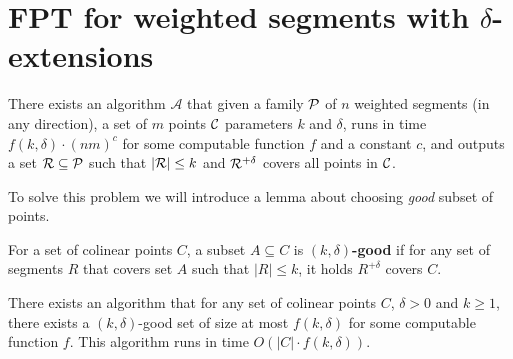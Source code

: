 \section{FPT for weighted segments with $\delta$-extensions}
\begin{tw}{
	\label{fpt_weighted_segment}
	There exists an algorithm $\mathcal{A}$ that given a family $\mathcal{P}$ of
	$n$ weighted segments (in any direction),
	a set of $m$ points $\mathcal{C}$
	parameters $k$ and $\delta$,
	runs in time $f(k, \delta) \cdot (nm)^c$ for some computable function $f$ and a constant $c$,
	and outputs a set $\mathcal{R} \subseteq \mathcal{P}$
	such that $|\mathcal{R}| \le k$ and $\mathcal{R}^{+\delta}$ covers all points in $\mathcal{C}$.
}\end{tw}


To solve this problem we will introduce a lemma about choosing
\textit{good} subset of points.

\begin{defi}
	For a set of colinear points $C$,
	a subset $A \subseteq C$ is \textbf{$(k,\delta)$-good} 
	if for any set of segments $R$ that covers set $A$
	such that $|R| \le k$, it holds $R^{+\delta}$ covers $C$.
\end{defi}

\begin{lemma}
	\label{good_set_exists}
	There exists an algorithm that
	for any set of colinear points $C$, $\delta > 0$ and $k \ge 1$,
	there exists a $(k,\delta)$-good set of size at most $f(k, \delta)$
	for some computable function $f$. This algorithm runs in time
	$O(|C| \cdot f(k, \delta))$.
\end{lemma}

